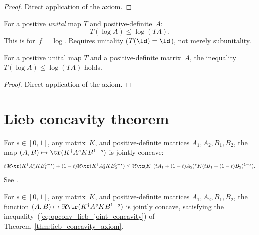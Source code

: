 \begin{proof}\leanok
    Direct application of the axiom.
\end{proof}

\begin{theorem}\label{thm:posMap_log_concave_jensen}
    \notready
    For a positive \emph{unital} map $T$ and positive-definite~$A$:
    \[
        T(\log A) \le \log(TA).
    \]
    This is \cite[Theorem~5.13]{Wolf2012Quantum} for~$f=\log$.
    Requires unitality ($T(\Id)=\Id$), not merely subunitality.
\end{theorem}

\begin{theorem}\label{thm:log_concave_jensen}
    \leanok
    For a positive unital map $T$ and a positive-definite matrix~$A$,
    the inequality $T(\log A) \le \log(TA)$ holds.
\end{theorem}

\begin{proof}\leanok
    Direct application of the axiom.
\end{proof}

\section{Lieb concavity theorem}

\begin{theorem}\label{thm:lieb_concavity_axiom}
    \notready
    For $s\in[0,1]$, any matrix~$K$, and positive-definite matrices
    $A_1,A_2,B_1,B_2$, the map
    $(A,B)\mapsto\tr(K^\dagger A^s K B^{1-s})$
    is jointly concave:
    \begin{equation}\label{eq:opconv_lieb_joint_concavity}
        t\,\Re\tr(K^\dagger A_1^s K B_1^{1-s})
        +(1-t) \Re\tr(K^\dagger A_2^s K B_2^{1-s})
        \le
        \Re\tr\!(K^\dagger(tA_1+(1-t)A_2)^s K (tB_1+(1-t)B_2)^{1-s}).
    \end{equation}
    See \cite{Lieb1973Convex,Ando1979Concavity}.
\end{theorem}

\begin{theorem}\label{thm:lieb_concavity}
    \leanok
    For $s\in[0,1]$, any matrix~$K$, and positive-definite matrices
    $A_1,A_2,B_1,B_2$, the function
    $(A,B)\mapsto\Re\tr(K^\dagger A^s K B^{1-s})$ is jointly concave,
    satisfying the inequality~(\ref{eq:opconv_lieb_joint_concavity}) of
    Theorem~\ref{thm:lieb_concavity_axiom}.
\end{theorem}


